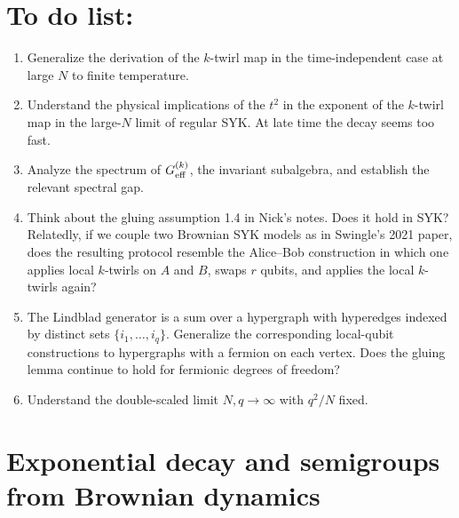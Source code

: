 \documentclass{article}
\theoremstyle{definition}
\begin{document}
\section*{To do list:}

\begin{enumerate}
\item Generalize the derivation of the $k$-twirl map in the time-independent
case at large $N$ to finite temperature.

\item Understand the physical implications of the $t^2$ in the exponent of
the $k$-twirl map in the large-$N$ limit of regular SYK.  At late time the
decay seems too fast.

\item Analyze the spectrum of $G_{\rm eff}^{(k)}$, the invariant subalgebra,
and establish the relevant spectral gap.

\item Think about the gluing assumption 1.4 in Nick's notes.  Does it hold in
SYK?  Relatedly, if we couple two Brownian SYK models as in Swingle's 2021
paper, does the resulting protocol resemble the Alice--Bob construction in
which one applies local $k$-twirls on $A$ and $B$, swaps $r$ qubits, and
applies the local $k$-twirls again?

\item The Lindblad generator is a sum over a hypergraph with hyperedges
indexed by distinct sets $\{i_1,\ldots,i_q\}$.  Generalize the corresponding
local-qubit constructions to hypergraphs with a fermion on each vertex.
Does the gluing lemma continue to hold for fermionic degrees of freedom?

\item Understand the double-scaled limit $N,q\to\infty$ with $q^2/N$ fixed.
\end{enumerate}

\section{Exponential decay and semigroups from Brownian dynamics}
\label{sec:brownian_general}
\end{document}
